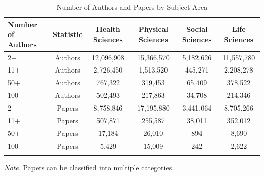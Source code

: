 \documentclass[
  man,floatsintext]{apa7}
\begin{document}
\begin{table}[tbp]

\begin{center}
\begin{threeparttable}

\caption{\label{tab:big-teams-table}Number of Authors and Papers by Subject Area}

\begin{tabular}{lccccc}
\toprule
Number of Authors & \multicolumn{1}{c}{Statistic} & \multicolumn{1}{c}{Health Sciences} & \multicolumn{1}{c}{Physical Sciences} & \multicolumn{1}{c}{Social Sciences} & \multicolumn{1}{c}{Life Sciences}\\
\midrule
2+ & Authors & 12,096,908 & 15,366,570 & 5,182,626 & 11,557,780\\
11+ & Authors & 2,726,450 & 1,513,520 & 445,271 & 2,208,278\\
50+ & Authors & 767,322 & 319,453 & 65,409 & 378,522\\
100+ & Authors & 502,493 & 217,863 & 34,708 & 214,346\\
2+ & Papers & 8,758,846 & 17,195,880 & 3,441,064 & 8,705,266\\
11+ & Papers & 507,871 & 255,587 & 38,011 & 352,012\\
50+ & Papers & 17,184 & 26,010 & 894 & 8,690\\
100+ & Papers & 5,429 & 15,009 & 242 & 2,622\\
\bottomrule
\addlinespace
\end{tabular}

\begin{tablenotes}[para]
\normalsize{\textit{Note.} Papers can be classified into multiple categories.}
\end{tablenotes}

\end{threeparttable}
\end{center}

\end{table}
\end{document}
